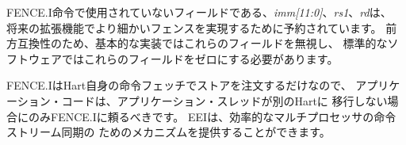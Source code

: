 FENCE.I命令で使用されていないフィールドである、{\em imm[11:0]}、{\em rs1}、{\em rd}は、
将来の拡張機能でより細かいフェンスを実現するために予約されています。 
前方互換性のため、基本的な実装ではこれらのフィールドを無視し、
標準的なソフトウェアではこれらのフィールドをゼロにする必要があります。

\begin{commentary}
\begin{comment}
Because FENCE.I only orders stores with a hart's own instruction
fetches, application code should only rely upon FENCE.I if the
application thread will not be migrated to a different hart.  The EEI
can provide mechanisms for efficient multiprocessor instruction-stream
synchronization.
\end{comment}
FENCE.IはHart自身の命令フェッチでストアを注文するだけなので、
アプリケーション・コードは、アプリケーション・スレッドが別のHartに
移行しない場合にのみFENCE.Iに頼るべきです。 
EEIは、効率的なマルチプロセッサの命令ストリーム同期の
ためのメカニズムを提供することができます。
\end{commentary}


